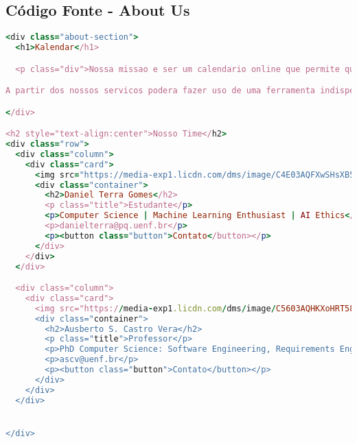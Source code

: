 \subsection{Código Fonte - About Us}

\begin{lstlisting}[language=Ruby, caption=About Us]
<div class="about-section">
  <h1>Kalendar</h1>

  <p class="div">Nossa missao e ser um calendario online que permite que um ou mais usuarios editem e, opcionalmente, compartilhem com outros usuarios o acesso online a um calendario.

A partir dos nossos servicos podera fazer uso de uma ferramenta indispensavel. Pois, nossas vidas diarias sao gerenciaveis apenas gracas aos nossos calendarios em nossos computadores e telefones. Um calendario online permite-nos gerir os nossos horarios e ajuda-nos na gestao do tempo. Pense em todas as vezes que as pessoas se esquecem de suas reunioes e compromissos agendados. As consequencias incluem remarcar as reunioes para uma data muito posterior ou ate mesmo pagar uma taxa por faltar a um compromisso. Um calendario online permite que voce sempre acompanhe suas reunioes e compromissos.</p>

</div>

<h2 style="text-align:center">Nosso Time</h2>
<div class="row">
  <div class="column">
    <div class="card">
      <img src="https://media-exp1.licdn.com/dms/image/C4E03AQFXwSHsXB5A-w/profile-displayphoto-shrink_200_200/0/1653855378664?e=1671062400&v=beta&t=JnZi5-8DhyHSwJWl68lXvud1KkoxXQDeGJyuVxGWdRY" alt="Daniel" style="width:5%">
      <div class="container">
        <h2>Daniel Terra Gomes</h2>
        <p class="title">Estudante</p>
        <p>Computer Science | Machine Learning Enthusiast | AI Ethics</p>
        <p>danielterra@pq.uenf.br</p>
        <p><button class="button">Contato</button></p>
      </div>
    </div>
  </div>

  <div class="column">
    <div class="card">
      <img src="https://media-exp1.licdn.com/dms/image/C5603AQHKXoHRT58ayQ/profile-displayphoto-shrink_200_200/0/1516814846280?e=1671062400&v=beta&t=cic_dbtWwgtjWRRnokSRsCxRugh6w52FOZYAksyRxEs" alt="Ausberto" style="width:5%">
      <div class="container">
        <h2>Ausberto S. Castro Vera</h2>
        <p class="title">Professor</p>
        <p>PhD Computer Science: Software Engineering, Requirements Engineering, Computer Security, Cloud Computing</p>
        <p>ascv@uenf.br</p>
        <p><button class="button">Contato</button></p>
      </div>
    </div>
  </div>


</div>

\end{lstlisting}




